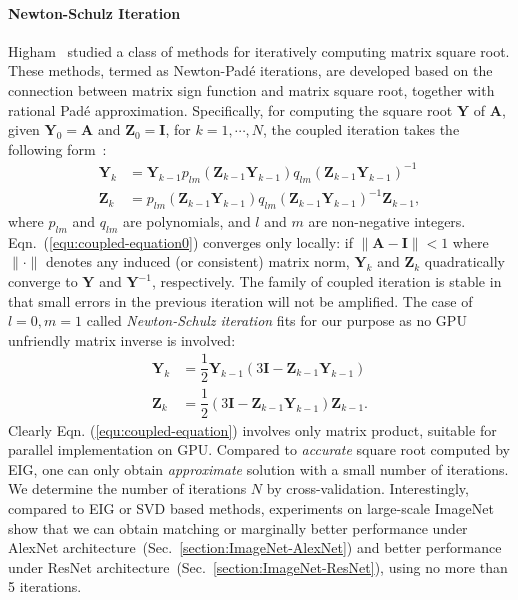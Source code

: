 \documentclass[10pt,twocolumn,letterpaper]{article}
\begin{document}
\vspace{-8pt}\paragraph{Newton-Schulz Iteration}
Higham~\cite{Higham:2008:FM} studied a class of methods for iteratively computing  matrix square root. These methods, termed as  Newton-Pad\'{e} iterations, are developed based on the connection between  matrix sign function and matrix square root, together with  rational Pad\'{e} approximation.  Specifically, for computing the square root $\mathbf{Y}$ of $\mathbf{A}$,   given $\mathbf{Y}_{0}=\mathbf{A}$ and $\mathbf{Z}_{0}=\mathbf{I}$, for $k=1,\cdots, N$, the coupled iteration  takes the following form~\cite[Chap. 6.7]{Higham:2008:FM}:
\begin{align}\label{equ:coupled-equation0}
\mathbf{Y}_{k}&=\mathbf{Y}_{k-1}p_{lm}(\mathbf{Z}_{k-1}\mathbf{Y}_{k-1})q_{lm}(\mathbf{Z}_{k-1}\mathbf{Y}_{k-1})^{-1}\nonumber \\
\mathbf{Z}_{k}&=p_{lm}(\mathbf{Z}_{k-1}\mathbf{Y}_{k-1})q_{lm}(\mathbf{Z}_{k-1}\mathbf{Y}_{k-1})^{-1}\mathbf{Z}_{k-1},
\end{align}
where $p_{lm}$ and $q_{lm}$ are polynomials, and $l$ and $m$ are non-negative integers. Eqn.~(\ref{equ:coupled-equation0}) converges only locally:  if $\|\mathbf{A}-\mathbf{I}\|<1$ where  $\|\cdot\|$  denotes any induced (or consistent) matrix norm, $\mathbf{Y}_{k}$ and $\mathbf{Z}_{k}$ quadratically converge to $\mathbf{Y}$ and $\mathbf{Y}^{-1}$, respectively. The family of coupled iteration is  stable in that small errors in the previous iteration will not be amplified.  The case of $l=0, m=1$ called \textit{Newton-Schulz iteration}   fits for our purpose as no GPU unfriendly matrix inverse is involved:
\begin{align}\label{equ:coupled-equation}
\mathbf{Y}_{k}&=\dfrac{1}{2}\mathbf{Y}_{k-1}(3\mathbf{I}-\mathbf{Z}_{k-1}\mathbf{Y}_{k-1})\nonumber \\
\mathbf{Z}_{k}&=\dfrac{1}{2}(3\mathbf{I}-\mathbf{Z}_{k-1}\mathbf{Y}_{k-1})\mathbf{Z}_{k-1}. 
\end{align}
Clearly Eqn. (\ref{equ:coupled-equation}) involves only matrix product, suitable for parallel implementation on GPU. Compared to \textit{accurate} square root  computed by EIG, one can only obtain \textit{approximate} solution with a small number of iterations. We determine the  number of iterations $N$  by cross-validation. Interestingly, compared to EIG or SVD based methods, experiments  on large-scale ImageNet show that  we can obtain matching or marginally better performance under AlexNet architecture~(Sec.~\ref{section:ImageNet-AlexNet}) and  better performance under ResNet architecture~(Sec.~\ref{section:ImageNet-ResNet}), using no more than 5 iterations.
\end{document}
